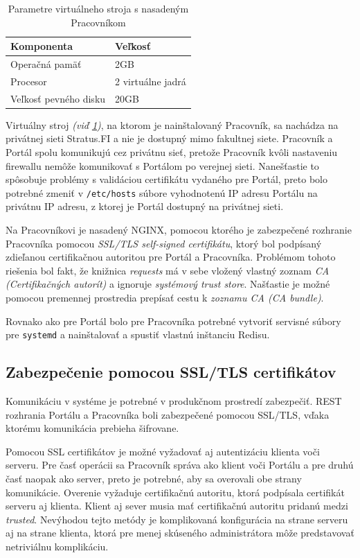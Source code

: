 \documentclass[
  digital, %
  oneside, %
  table,   %
  lof,     %
  lot,   %
]{fithesis3}
\begin{document}
\begin{table}[h]
\begin{tabular}{l l}
Komponenta & Veľkosť \\ [0.5ex] 
\hline
Operačná pamäť & 2GB  \\
Procesor & 2 virtuálne jadrá  \\
Veľkosť pevného disku&  20GB \\
\end{tabular}
\caption{Parametre virtuálneho stroja s nasadeným Pracovníkom} \label{tab:machine-worker}
\end{table}

Virtuálny stroj \emph{(viď \ref{tab:machine-worker})}, na ktorom je nainštalovaný Pracovník, sa nachádza na privátnej sieti Stratus.FI a nie je dostupný mimo fakultnej siete. Pracovník a Portál spolu komunikujú cez privátnu sieť, pretože Pracovník kvôli nastaveniu firewallu nemôže komunikovať s Portálom po verejnej sieti. Nanešťastie to spôsobuje problémy s validáciou certifikátu vydaného pre Portál, preto bolo potrebné zmeniť v \texttt{/etc/hosts} súbore vyhodnotenú IP adresu Portálu na privátnu IP adresu, z ktorej je Portál dostupný na privátnej sieti.

Na Pracovníkovi je nasadený NGINX, pomocou ktorého je zabezpečené rozhranie Pracovníka pomocou \emph{SSL/TLS self-signed certifikátu}, ktorý bol podpísaný zdieľanou certifikačnou autoritou pre Portál a Pracovníka. Problémom tohoto riešenia bol fakt, že knižnica \emph{requests} má v sebe vložený vlastný zoznam \emph{CA (Certifikačných autorít)}\cite{RFC5280} a ignoruje \emph{systémový trust store}. Našťastie je možné pomocou premennej prostredia prepísať cestu k \emph{zoznamu CA (CA bundle)}.

Rovnako ako pre Portál bolo pre Pracovníka potrebné vytvoriť servisné súbory pre \texttt{systemd} a nainštalovať a spustiť vlastnú inštanciu Redisu.

\subsection{Zabezpečenie pomocou SSL/TLS certifikátov}

Komunikáciu v systéme je potrebné v produkčnom prostredí zabezpečiť. REST rozhrania Portálu a Pracovníka boli zabezpečené pomocou SSL/TLS, vďaka ktorému komunikácia prebieha šifrovane. 

Pomocou SSL certifikátov je možné vyžadovať aj autentizáciu klienta voči serveru.
Pre časť operácii sa Pracovník správa ako klient voči Portálu a pre druhú časť naopak ako server, preto je potrebné, aby sa overovali obe strany komunikácie. Overenie vyžaduje certifikačnú autoritu, ktorá podpísala certifikát serveru aj klienta\cite{RFC2818}. Klient aj sever musia mať certifikačnú autoritu pridanú medzi \emph{trusted}. Nevýhodou tejto metódy je komplikovaná konfigurácia na strane serveru aj na strane klienta, ktorá pre menej skúseného administrátora môže predstavovať netriviálnu komplikáciu.
\end{document}
